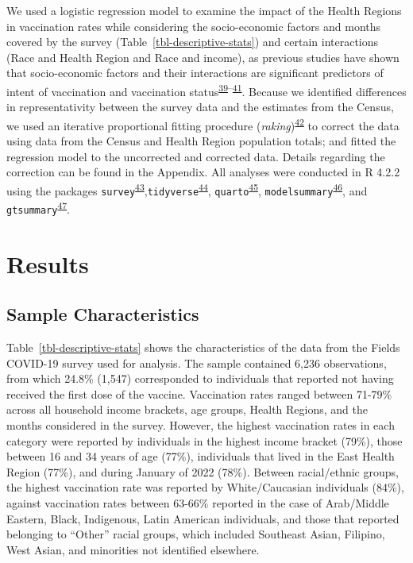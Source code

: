 \documentclass[
]{article}
\begin{document}
We used a logistic regression model to examine the impact of the Health
Regions in vaccination rates while considering the socio-economic
factors and months covered by the survey
(Table~\ref{tbl-descriptive-stats}) and certain interactions (Race and
Health Region and Race and income), as previous studies have shown that
socio-economic factors and their interactions are significant predictors
of intent of vaccination and vaccination
status\textsuperscript{\protect\hyperlink{ref-nguyen2022}{39}--\protect\hyperlink{ref-cnat2022a}{41}}.
Because we identified differences in representativity between the survey
data and the estimates from the Census, we used an iterative
proportional fitting procedure
(\emph{raking})\textsuperscript{\protect\hyperlink{ref-deming1940}{42}}
to correct the data using data from the Census and Health Region
population totals; and fitted the regression model to the uncorrected
and corrected data. Details regarding the correction can be found in the
Appendix. All analyses were conducted in R 4.2.2 using the packages
\texttt{survey}\textsuperscript{\protect\hyperlink{ref-lumley2011}{43}},\texttt{tidyverse}\textsuperscript{\protect\hyperlink{ref-wickham2019}{44}},
\texttt{quarto}\textsuperscript{\protect\hyperlink{ref-quarto}{45}},
\texttt{modelsummary}\textsuperscript{\protect\hyperlink{ref-modelsummary}{46}},
and
\texttt{gtsummary}\textsuperscript{\protect\hyperlink{ref-gtsummary}{47}}.

\hypertarget{results}{%
\section{Results}\label{results}}

\hypertarget{sample-characteristics}{%
\subsection{Sample Characteristics}\label{sample-characteristics}}

Table~\ref{tbl-descriptive-stats} shows the characteristics of the data
from the Fields COVID-19 survey used for analysis. The sample contained
6,236 observations, from which 24.8\% (1,547) corresponded to
individuals that reported not having received the first dose of the
vaccine. Vaccination rates ranged between 71-79\% across all household
income brackets, age groups, Health Regions, and the months considered
in the survey. However, the highest vaccination rates in each category
were reported by individuals in the highest income bracket (79\%), those
between 16 and 34 years of age (77\%), individuals that lived in the
East Health Region (77\%), and during January of 2022 (78\%). Between
racial/ethnic groups, the highest vaccination rate was reported by
White/Caucasian individuals (84\%), against vaccination rates between
63-66\% reported in the case of Arab/Middle Eastern, Black, Indigenous,
Latin American individuals, and those that reported belonging to
``Other'' racial groups, which included Southeast Asian, Filipino, West
Asian, and minorities not identified elsewhere.
\end{document}
